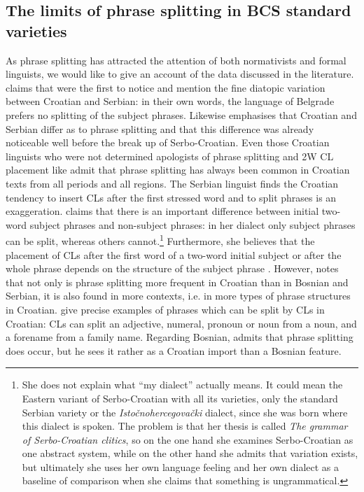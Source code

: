 \subsection{The limits of phrase splitting in BCS standard varieties}
\label{The limits of phrase splitting in BCS standard varieties}
As phrase splitting has attracted the attention of both normativists and formal linguists, we would like to give an account of the data discussed in the literature. \citet[81]{Reinkowski01} claims that \citet[289]{MeilletVaillant24} were the first to notice and mention the fine diatopic variation between Croatian and Serbian: in their own words, the language of Belgrade prefers no splitting of the subject phrases. Likewise \citet[11]{Alexander08} emphasises that Croatian and Serbian differ as to phrase splitting and that this difference was already noticeable well before the break up of Serbo-Croatian. Even those Croatian linguists who were not determined apologists of phrase splitting and 2W CL placement like \citet[145]{Brabec65} admit that phrase splitting has always been common in Croatian texts from all periods and all regions. The Serbian linguist \citet[309]{Pesikan58} finds the Croatian tendency to insert CLs after the first stressed word and to split phrases is an exaggeration. \citet[111]{RadanovicKocic88} claims that there is an important difference between initial two-word subject phrases and non-subject phrases: in her dialect only subject phrases can be split, whereas others cannot.\footnote{She does not explain what “my dialect” actually means. It could mean the Eastern variant of Serbo-Croatian with all its varieties, only the standard Serbian variety or the \textit{Istočnohercegovački} dialect, since she was born where this dialect is spoken. The problem is that her thesis is called \textit{The grammar of Serbo-Croatian clitics}, so on the one hand she examines Serbo-Croatian as one abstract system, while on the other hand she admits that variation exists, but ultimately she uses her own language feeling and her own dialect as a baseline of comparison when she claims that something is ungrammatical.} Furthermore, she believes that the placement of CLs after the first word of a two-word initial subject or after the whole phrase depends on the structure of the subject phrase \citep[cf.][112]{RadanovicKocic88}. However, \citet[52--55]{Alexander09} notes that not only is phrase splitting more frequent in Croatian than in Bosnian and Serbian, it is also found in more contexts, i.e. in more types of phrase structures in Croatian. \citet[182]{FHM06} give precise examples of phrases which can be split by CLs in Croatian: CLs can split an adjective, numeral, pronoun or noun from a noun, and a forename from a family name. Regarding Bosnian, \citet[196f]{Cedic01} admits that phrase splitting does occur, but he sees it rather as a Croatian import than a Bosnian feature. 

